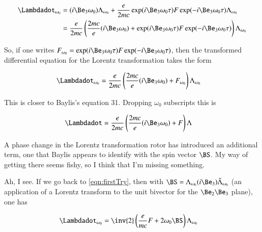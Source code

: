 \documentclass{article}
\newcommand{\reverse}[1]{\tilde{{#1}}}
\begin{document}
\begin{align*}
\Lambdadot_{\omega_0} 
&= 
( i \Be_3 \omega_0 ) \Lambda_{\omega_0} 
+ \frac{e}{2 m c} 
\exp( i \Be_3 \omega_0 \tau) 
F 
\exp( -i \Be_3 \omega_0 \tau)
\Lambda_{\omega_0}  \\
&=
\frac{e}{2 m c} \left(
\frac{2 m c}{e} ( i \Be_3 \omega_0 ) 
+ 
\exp( i \Be_3 \omega_0 \tau) 
F 
\exp( -i \Be_3 \omega_0 \tau)
\right)
\Lambda_{\omega_0} 
\end{align*}

So, if one writes $F_{\omega_0} = \exp( i \Be_3 \omega_0 \tau) F \exp( -i \Be_3 \omega_0 \tau)$, then
the transformed differential equation for the Lorentz transformation takes the form 

\begin{align*}
\Lambdadot_{\omega_0}
&=
\frac{e}{2 m c} \left(
\frac{2 m c}{e} ( i \Be_3 \omega_0 ) 
+ 
F_{\omega_0}
\right)
\Lambda_{\omega_0} 
\end{align*}

This is closer to Baylis's equation 31.
Dropping $\omega_0$ subscripts this is

\begin{align*}
\Lambdadot
&=
\frac{e}{2 m c} \left(
\frac{2 m c}{e} ( i \Be_3 \omega_0 ) 
+ 
F
\right)
\Lambda
\end{align*}

A phase change in the Lorentz transformation rotor has introduced an additional term, one that 
Baylis appears to identify with the spin vector $\BS$.  My way of getting there seems fishy, so I think that 
I'm missing something.

Ah, I see.  If we go back to \ref{eqn:firstTry}, then with 
$\BS = \Lambda_{\omega_0} ( i \Be_3 ) \reverse{\Lambda}_{\omega_0}$ (an application of a Lorentz transform to the unit bivector for the $\Be_2 \Be_3$ plane), one has

\begin{align*}
\Lambdadot_{\omega_0} 
&= \inv{2} \left( \frac{e}{m c} F + 2 \omega_0 \BS \right) \Lambda_{\omega_0} 
\end{align*}



\end{document}
